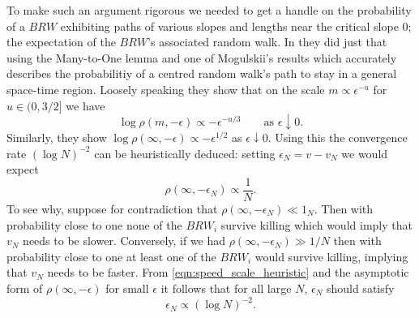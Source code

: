 To make such an argument rigorous we needed to get a handle on the probability of a $BRW$ exhibiting paths of various slopes and lengths near the critical slope $0$; the expectation of the $BRW$'s associated random walk. In \cite{gantert2008asymptotics} they did just that using the Many-to-One lemma and one of Mogulskii's results which accurately describes the probabilitiy of a centred random walk's path to stay in a general space-time region. Loosely speaking they show that on the scale $m \propto \epsilon^{-u}$ for $u \in (0, 3/2]$ we have
\begin{equation}
\log \rho(m, -\epsilon) \propto - \epsilon^{-u/3}\qquad\text{as } \epsilon \downarrow 0. 
\end{equation}
Similarly, they show $\log\rho(\infty, -\epsilon) \propto - \epsilon^{1/2}$ as $\epsilon \downarrow 0$. Using this the convergence rate $(\log N)^{-2}$ can be heuristically deduced: setting $\epsilon_N = v - v_N$ we would expect 
\begin{equation}\label{eqn:speed_scale_heuristic}
\rho(\infty, - \epsilon_N) \propto \frac{1}{N}. 
\end{equation}
To see why, suppose for contradiction that $\rho(\infty, - \epsilon_N) \ll 1_N$. Then with probability close to one none of the $BRW_i$ survive killing which would imply that $v_N$ needs to be slower. Conversely, if we had $\rho(\infty, - \epsilon_N) \gg 1/N$ then with probability close to one at least one of the $BRW_i$ would survive killing, implying that $v_N$ needs to be faster. From \ref{eqn:speed_scale_heuristic} and the asymptotic form of $\rho(\infty, -\epsilon)$ for small $\epsilon$ it follows that for all large $N$, $\epsilon_N$ should satisfy
\begin{equation}
\epsilon_N \propto (\log N)^{-2}. 
\end{equation}
